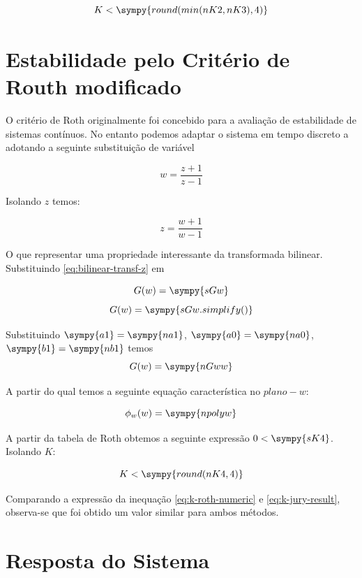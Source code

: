 \documentclass[a4paper,11pt]{article}
\newcommand{\npy}[1]{\sympy{round(#1,4)}}
\begin{document}
\begin{equation}\label{eq:k-jury-result}
    K < \sympy{round(min(nK2,nK3),4)}
\end{equation}

\section{Estabilidade pelo Critério de Routh modificado}

O critério de Roth originalmente foi concebido para a avaliação de estabilidade de sistemas contínuos. No entanto podemos adaptar o sistema em tempo discreto a adotando a seguinte substituição de variável

\begin{equation}\label{eq:bilinear-transf-w}
    w = \frac{z+1}{z-1}
\end{equation}

Isolando $z$ temos:

\begin{equation}\label{eq:bilinear-transf-z}
    z = \frac{w+1}{w-1}
\end{equation}

O que representar uma propriedade interessante da transformada bilinear. Substituindo \ref{eq:bilinear-transf-z} em

$$G(w) = \sympy{sGw}$$
$$G(w) = \sympy{sGw.simplify()}$$

Substituindo $\sympy{a1} = \sympy{na1}$, $\sympy{a0} = \sympy{na0}$, $\sympy{b1} = \sympy{nb1}$ temos
$$G(w) = \sympy{nGww}$$

A partir do qual temos a seguinte equação característica no $plano-w$:

\begin{equation}
    \phi_w(w) = \sympy{npolyw}
\end{equation}


A partir da tabela de Roth obtemos a seguinte expressão $0 < \sympy{sK4}$. Isolando $K$:

\begin{equation}\label{eq:k-roth-numeric}
    K < \npy{nK4}
\end{equation}

Comparando a expressão da inequação \ref{eq:k-roth-numeric} e \ref{eq:k-jury-result}, observa-se que foi obtido um valor similar para ambos métodos.

\section{Resposta do Sistema}
\end{document}
